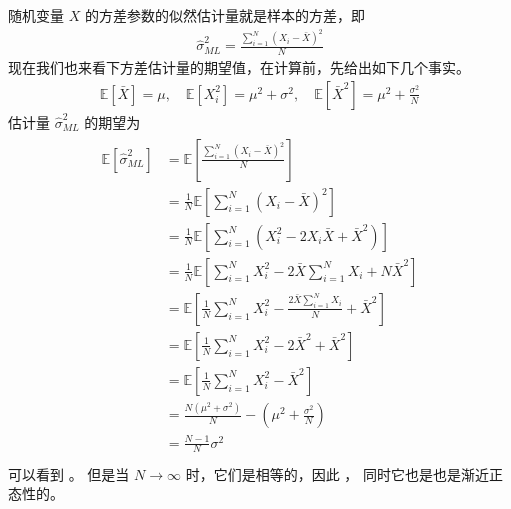 \documentclass[letterpaper,10pt,english]{sphinxmanual}
\begin{document}

随机变量 \(X\) 的方差参数的似然估计量就是样本的方差，即
\begin{equation}\label{equation:推断与检验/content:推断与检验/content:66}
\begin{split}\hat{\sigma}^2_{ML}  = \frac{\sum_{i=1}^N (X_i - \bar{X})^2 }{N}\end{split}
\end{equation}
现在我们也来看下方差估计量的期望值，在计算前，先给出如下几个事实。
\begin{equation}\label{equation:推断与检验/content:推断与检验/content:67}
\begin{split}\mathbb{E}[\bar{X}] = \mu,\quad
\mathbb{E}[X_i^2] = \mu^2 + \sigma^2,\quad
\mathbb{E}[\bar{X}^2] = \mu^2 + \frac{\sigma^2}{N}\end{split}
\end{equation}
估计量 \(\hat{\sigma}^2_{ML}\) 的期望为
\begin{align}\label{equation:推断与检验/content:推断与检验/content:68}\!\begin{aligned}
\mathbb{E}[\hat{\sigma}^2_{ML}] &=  \mathbb{E} \left [ \frac{\sum_{i=1}^N (X_i - \bar{X})^2 }{N} \right ]\\
&= \frac{1}{N}  \mathbb{E} \left [\sum_{i=1}^N (X_i - \bar{X})^2 \right ]\\
&= \frac{1}{N}  \mathbb{E} \left [\sum_{i=1}^N ( X_i^2 -  2 X_i \bar{X} + \bar{X}^2 ) \right ]\\
&= \frac{1}{N}  \mathbb{E} \left [\sum_{i=1}^N  X_i^2 -  2  \bar{X} \sum_{i=1}^N X_i + N \bar{X}^2   \right ]\\
&= \mathbb{E} \left [ \frac{1}{N}  \sum_{i=1}^N  X_i^2 -  \frac{2  \bar{X} \sum_{i=1}^N X_i}{N} +  \bar{X}^2   \right ]\\
&= \mathbb{E} \left [ \frac{1}{N}  \sum_{i=1}^N  X_i^2 -  2  \bar{X}^2 +  \bar{X}^2   \right ]\\
&= \mathbb{E} \left [ \frac{1}{N}  \sum_{i=1}^N  X_i^2 -  \bar{X}^2   \right ]\\
&= \frac{N(\mu^2 +\sigma^2)}{N}  - \left (  \mu^2 + \frac{\sigma^2}{N} \right )\\
&= \frac{N-1}{N} \sigma^2\\
\end{aligned}\end{align}
可以看到 。
但是当 \(N \rightarrow \infty\) 时，它们是相等的，因此 ，
同时它也是也是渐近正态性的。
\end{document}
